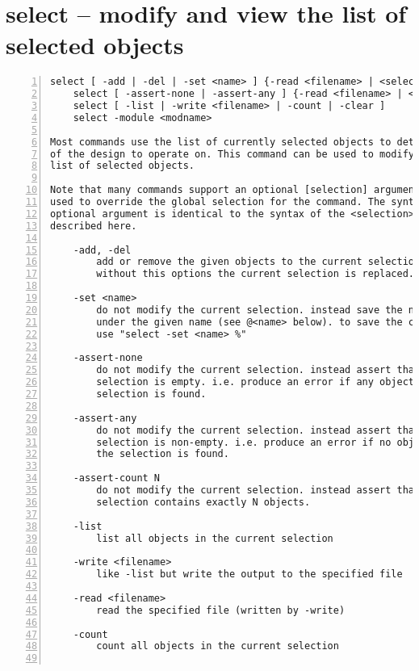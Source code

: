\section{select -- modify and view the list of selected objects}
\label{cmd:select}
\begin{lstlisting}[numbers=left,frame=single]
    select [ -add | -del | -set <name> ] {-read <filename> | <selection>}
    select [ -assert-none | -assert-any ] {-read <filename> | <selection>}
    select [ -list | -write <filename> | -count | -clear ]
    select -module <modname>

Most commands use the list of currently selected objects to determine which part
of the design to operate on. This command can be used to modify and view this
list of selected objects.

Note that many commands support an optional [selection] argument that can be
used to override the global selection for the command. The syntax of this
optional argument is identical to the syntax of the <selection> argument
described here.

    -add, -del
        add or remove the given objects to the current selection.
        without this options the current selection is replaced.

    -set <name>
        do not modify the current selection. instead save the new selection
        under the given name (see @<name> below). to save the current selection,
        use "select -set <name> %"

    -assert-none
        do not modify the current selection. instead assert that the given
        selection is empty. i.e. produce an error if any object matching the
        selection is found.

    -assert-any
        do not modify the current selection. instead assert that the given
        selection is non-empty. i.e. produce an error if no object matching
        the selection is found.

    -assert-count N
        do not modify the current selection. instead assert that the given
        selection contains exactly N objects.

    -list
        list all objects in the current selection

    -write <filename>
        like -list but write the output to the specified file

    -read <filename>
        read the specified file (written by -write)

    -count
        count all objects in the current selection


\end{lstlisting}
